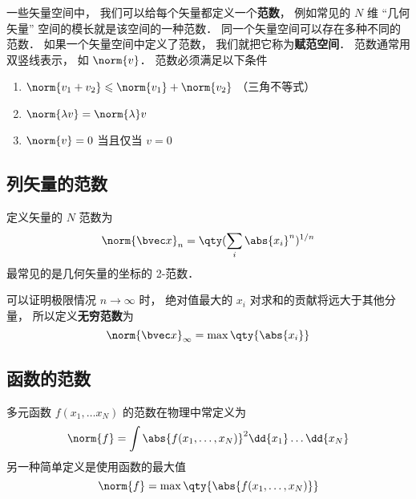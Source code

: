 

一些矢量空间中， 我们可以给每个矢量都定义一个\textbf{范数}， 例如常见的 $N$ 维 “几何矢量” 空间的模长就是该空间的一种范数． 同一个矢量空间可以存在多种不同的范数． 如果一个矢量空间中定义了范数， 我们就把它称为\textbf{赋范空间}． 范数通常用双竖线表示， 如 $\norm{v}$． 范数必须满足以下条件

\begin{enumerate}
\item $\norm{v_1 + v_2} \leqslant \norm{v_1} + \norm{v_2}$ （三角不等式）
\item $\norm{\lambda v} = \norm{\lambda} v$
\item $\norm{v} = 0$ 当且仅当 $v = 0$
\end{enumerate}

\subsection{列矢量的范数}
定义矢量的 $N$ 范数为
\begin{equation}
\norm{\bvec x}_n = \qty(\sum_i \abs{x_i}^n)^{1/n}
\end{equation}
最常见的是几何矢量的坐标的 2-范数．


可以证明极限情况 $n \to \infty$ 时， 绝对值最大的 $x_i$ 对求和的贡献将远大于其他分量， 所以定义\textbf{无穷范数}为
\begin{equation}
\norm{\bvec x}_\infty = \max \qty{\abs{x_i}}
\end{equation}

\subsection{函数的范数}
多元函数 $f(x_1, \dots x_N)$ 的范数在物理中常定义为
\begin{equation}
\norm{f} = \int \abs{f(x_1, \dots, x_N)}^2 \dd{x_1}\dots \dd{x_N}
\end{equation}
另一种简单定义是使用函数的最大值
\begin{equation}
\norm{f} = \max\qty{\abs{f(x_1, \dots, x_N)}}
\end{equation}
